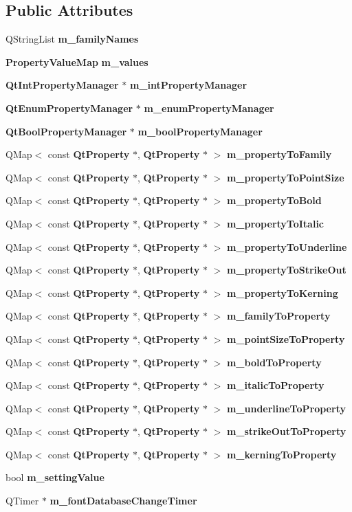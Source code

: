\subsection*{Public Attributes}
\begin{DoxyCompactItemize}
\item 
Q\+String\+List {\bf m\+\_\+family\+Names}
\item 
{\bf Property\+Value\+Map} {\bf m\+\_\+values}
\item 
{\bf Qt\+Int\+Property\+Manager} $\ast$ {\bf m\+\_\+int\+Property\+Manager}
\item 
{\bf Qt\+Enum\+Property\+Manager} $\ast$ {\bf m\+\_\+enum\+Property\+Manager}
\item 
{\bf Qt\+Bool\+Property\+Manager} $\ast$ {\bf m\+\_\+bool\+Property\+Manager}
\item 
Q\+Map$<$ const {\bf Qt\+Property} $\ast$, {\bf Qt\+Property} $\ast$ $>$ {\bf m\+\_\+property\+To\+Family}
\item 
Q\+Map$<$ const {\bf Qt\+Property} $\ast$, {\bf Qt\+Property} $\ast$ $>$ {\bf m\+\_\+property\+To\+Point\+Size}
\item 
Q\+Map$<$ const {\bf Qt\+Property} $\ast$, {\bf Qt\+Property} $\ast$ $>$ {\bf m\+\_\+property\+To\+Bold}
\item 
Q\+Map$<$ const {\bf Qt\+Property} $\ast$, {\bf Qt\+Property} $\ast$ $>$ {\bf m\+\_\+property\+To\+Italic}
\item 
Q\+Map$<$ const {\bf Qt\+Property} $\ast$, {\bf Qt\+Property} $\ast$ $>$ {\bf m\+\_\+property\+To\+Underline}
\item 
Q\+Map$<$ const {\bf Qt\+Property} $\ast$, {\bf Qt\+Property} $\ast$ $>$ {\bf m\+\_\+property\+To\+Strike\+Out}
\item 
Q\+Map$<$ const {\bf Qt\+Property} $\ast$, {\bf Qt\+Property} $\ast$ $>$ {\bf m\+\_\+property\+To\+Kerning}
\item 
Q\+Map$<$ const {\bf Qt\+Property} $\ast$, {\bf Qt\+Property} $\ast$ $>$ {\bf m\+\_\+family\+To\+Property}
\item 
Q\+Map$<$ const {\bf Qt\+Property} $\ast$, {\bf Qt\+Property} $\ast$ $>$ {\bf m\+\_\+point\+Size\+To\+Property}
\item 
Q\+Map$<$ const {\bf Qt\+Property} $\ast$, {\bf Qt\+Property} $\ast$ $>$ {\bf m\+\_\+bold\+To\+Property}
\item 
Q\+Map$<$ const {\bf Qt\+Property} $\ast$, {\bf Qt\+Property} $\ast$ $>$ {\bf m\+\_\+italic\+To\+Property}
\item 
Q\+Map$<$ const {\bf Qt\+Property} $\ast$, {\bf Qt\+Property} $\ast$ $>$ {\bf m\+\_\+underline\+To\+Property}
\item 
Q\+Map$<$ const {\bf Qt\+Property} $\ast$, {\bf Qt\+Property} $\ast$ $>$ {\bf m\+\_\+strike\+Out\+To\+Property}
\item 
Q\+Map$<$ const {\bf Qt\+Property} $\ast$, {\bf Qt\+Property} $\ast$ $>$ {\bf m\+\_\+kerning\+To\+Property}
\item 
bool {\bf m\+\_\+setting\+Value}
\item 
Q\+Timer $\ast$ {\bf m\+\_\+font\+Database\+Change\+Timer}
\end{DoxyCompactItemize}


